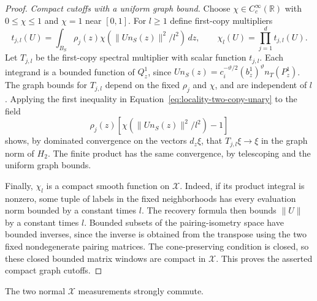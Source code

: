 \begin{proof}
\emph{Compact cutoffs with a uniform graph bound.}
Choose $\chi\in C_c^\infty(\mathbb R)$ with $0\le\chi\le1$ and
$\chi=1$ near $[0,1]$. For $l\ge1$ define first-copy multipliers
\[
 t_{j,l}(U)=\int_{B_S}\rho_j(z)
   \chi\!\left(\|U n_S(z)\|^2/l^2\right)\,dz,
 \qquad \chi_l(U)=\prod_{j=1}^d t_{j,l}(U).
\]
Let $T_{j,l}$ be the first-copy spectral multiplier with scalar function
$t_{j,l}$. Each integrand is a bounded function of $Q_z^1$, since
$U n_S(z)=c_i^{-\vartheta/2}(b_z^1)^\vartheta n_T(P_z^1)$.
The graph bounds for $T_{j,l}$ depend on the fixed $\rho_j$ and $\chi$,
and are independent of $l$. Applying the first inequality in
Equation~\eqref{eq:locality-two-copy-unary} to the field
\[
 \rho_j(z)\left[
 \chi\!\left(\|U n_S(z)\|^2/l^2\right)-1\right]
\]
shows, by dominated convergence on the vectors $d_z\xi$, that
$T_{j,l}\xi\to\xi$ in the graph norm of $H_2$. The finite product has
the same convergence, by telescoping and the uniform graph bounds.

Finally, $\chi_l$ is a compact smooth function on $\mathcal X$.
Indeed, if its product integral is nonzero, some tuple of labels in the
fixed neighborhoods has every evaluation norm bounded by a constant
times $l$. The recovery formula then bounds $\|U\|$ by a constant times
$l$. Bounded subsets of the pairing-isometry space have bounded inverses,
since the inverse is obtained from the transpose using the two fixed
nondegenerate pairing matrices. The cone-preserving condition is closed,
so these closed bounded matrix windows are compact in $\mathcal X$.
This proves the asserted compact graph cutoffs.
\end{proof}

\begin{lemma}
\label{lem:locality-two-copy-commutation}
The two normal $\mathcal X$ measurements strongly commute.
\end{lemma}

